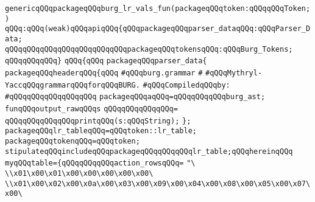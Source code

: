 \label{src/app/burg/burg.grammar.pkg}
\verb|genericqQQqpackageqQQqburg_lr_vals_fun(packageqQQqtoken:qQQqqQQqToken;)|\newline
\verb|qQQq:qQQq(weak)qQQqapiqQQq{qQQqpackageqQQqparser_dataqQQq:qQQqParser_Data;|\newline
\verb|qQQqqQQqqQQqqQQqqQQqqQQqqQQqpackageqQQqtokensqQQq:qQQqBurg_Tokens;|\newline
\verb|qQQqqQQqqQQq}|\newline
\verb|qQQq{qQQq|\newline
\verb|packageqQQqparser_data{|\newline
\verb|packageqQQqheaderqQQq{qQQq|\newline
\verb|#qQQqburg.grammar|\newline
\verb|#|\newline
\verb|#qQQqMythryl-YaccqQQqgrammarqQQqforqQQqBURG.|\newline
\newline
\verb|#qQQqCompiledqQQqby:|\newline
\verb|#qQQqqQQqqQQqqQQqqQQq|\newline
\newline
\newline
\newline
\verb|packageqQQqaqQQq=qQQqqQQqqQQqburg_ast;|\newline
\newline
\verb|funqQQqoutput_rawqQQqs|\newline
\verb|qQQqqQQqqQQqqQQq=|\newline
\verb|qQQqqQQqqQQqqQQqprintqQQq(s:qQQqString);|\newline
\newline
\newline
\verb|};|\newline
\verb|packageqQQqlr_tableqQQq=qQQqtoken::lr_table;|\newline
\verb|packageqQQqtokenqQQq=qQQqtoken;|\newline
\verb|stipulateqQQqincludeqQQqpackageqQQqqQQqqQQqlr_table;qQQqhereinqQQq|\newline
\verb|myqQQqtable={qQQqqQQqqQQqaction_rowsqQQq=|\newline
\verb|"\|\newline
\verb|\\x01\x00\x01\x00\x00\x00\x00\x00\|\newline
\verb|\\x01\x00\x02\x00\x0a\x00\x03\x00\x09\x00\x04\x00\x08\x00\x05\x00\x07\x00\|\newline
